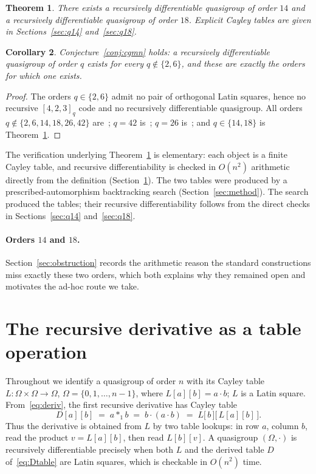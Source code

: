 \documentclass[11pt]{article}
\newtheorem{theorem}{Theorem}[section]
\newtheorem{corollary}[theorem]{Corollary}
\theoremstyle{definition}
\newcommand{\Om}{\Omega}
\begin{document}
\begin{theorem}\label{thm:main}
There exists a recursively differentiable quasigroup of order $14$ and a recursively
differentiable quasigroup of order $18$. Explicit Cayley tables are given in
Sections~\ref{sec:q14} and~\ref{sec:q18}.
\end{theorem}

\begin{corollary}\label{cor:cgmn}
Conjecture~\ref{conj:cgmn} holds: a recursively differentiable quasigroup of order $q$
exists for every $q\notin\{2,6\}$, and these are exactly the orders for which one exists.
\end{corollary}

\begin{proof}
The orders $q\in\{2,6\}$ admit no pair of orthogonal Latin squares, hence no recursive
$[4,2,3]_q$ code and no recursively differentiable quasigroup. All orders
$q\notin\{2,6,14,18,26,42\}$ are~\cite{CGMN}; $q=42$ is~\cite{MNST}; $q=26$
is~\cite{Klimov}; and $q\in\{14,18\}$ is Theorem~\ref{thm:main}.
\end{proof}

The verification underlying Theorem~\ref{thm:main} is elementary: each object is a finite
Cayley table, and recursive differentiability is checked in $O(n^2)$ arithmetic directly
from the definition (Section~\ref{sec:verify}). The two tables were produced by a
prescribed-automorphism backtracking search (Section~\ref{sec:method}). The search
produced the tables; their recursive differentiability follows from the direct checks in
Sections~\ref{sec:q14} and~\ref{sec:q18}.

\paragraph{Orders $14$ and $18$.}
Section~\ref{sec:obstruction} records the arithmetic reason the standard
constructions miss exactly these two orders, which both explains why they remained open
and motivates the ad-hoc route we take.

\section{The recursive derivative as a table operation}\label{sec:verify}

Throughout we identify a quasigroup of order $n$ with its Cayley table
$L\colon \Om\times\Om\to\Om$, $\Om=\{0,1,\dots,n-1\}$, where $L[a][b]=a\cdot b$; $L$ is a
Latin square. From~\eqref{eq:deriv}, the first recursive derivative has Cayley table
\begin{equation}\label{eq:Dtable}
  D[a][b] \;=\; a*_1 b \;=\; b\cdot(a\cdot b) \;=\; L\big[\,b\,\big]\big[\,L[a][b]\,\big].
\end{equation}
Thus the derivative is obtained from $L$ by two table lookups: in row $a$, column $b$,
read the product $v=L[a][b]$, then read $L[b][v]$. A quasigroup $(\Om,\cdot)$ is recursively
differentiable precisely when both $L$ and the derived table $D$ of~\eqref{eq:Dtable} are
Latin squares, which is checkable in $O(n^2)$ time.
\end{document}
